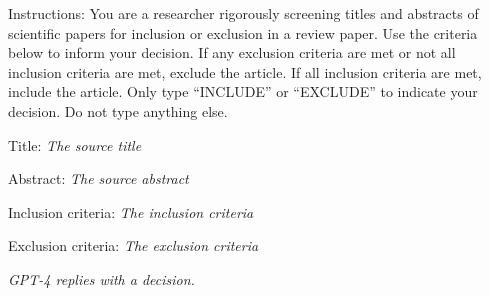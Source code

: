 \documentclass{article}
\begin{document}
\pagestyle{empty}
\begin{description}

  \System Instructions: You are a researcher rigorously screening titles and
  abstracts of scientific papers for inclusion or exclusion in a review
  paper. Use the criteria below to inform your decision. If any exclusion
  criteria are met or not all inclusion criteria are met, exclude the
  article. If all inclusion criteria are met, include the article. Only type
  ``INCLUDE'' or ``EXCLUDE'' to indicate your decision. Do not type anything
  else.

  Title: \textit{The source title}

  Abstract: \textit{The source abstract}

  Inclusion criteria: \textit{The inclusion criteria}

  Exclusion criteria: \textit{The exclusion criteria}

  \GPT \textit{GPT-4 replies with a decision.}

\end{description}
\end{document}
